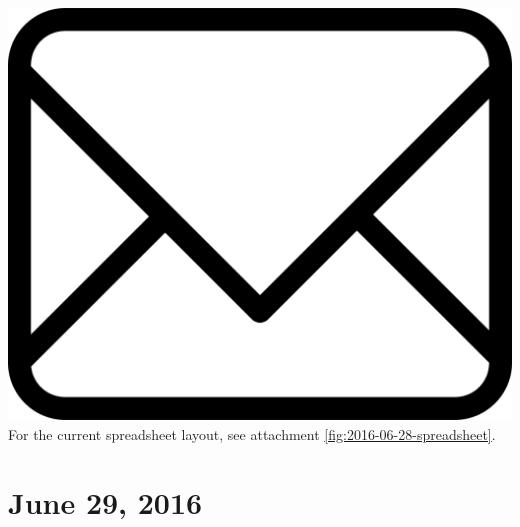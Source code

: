\documentclass{article}
\begin{document}
\vspace{2em}
\noindent\includegraphics[height=\fontcharht\font`\B]{icons/attachment-email} For the current spreadsheet layout, see attachment \ref{fig:2016-06-28-spreadsheet}.
\vspace{2em}


\section{June 29, 2016}
\end{document}
